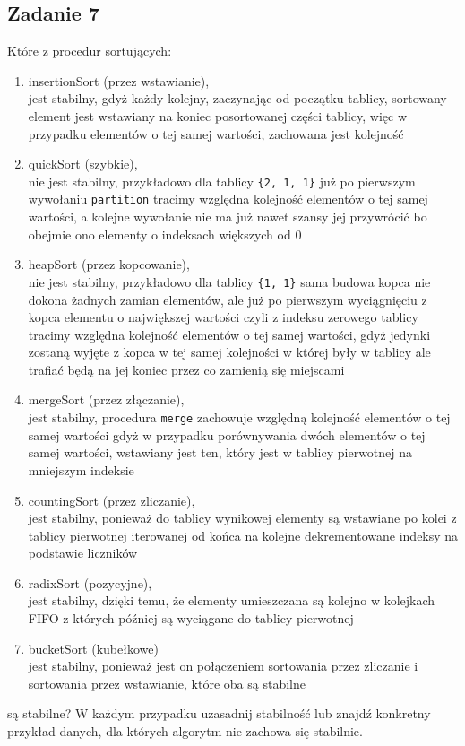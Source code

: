 \documentclass{article}
\begin{document}
\subsection*{Zadanie 7}
Które z procedur sortujących:
\begin{enumerate}[label=(\alph*)]
    \item insertionSort (przez wstawianie), \\
          jest stabilny, gdyż każdy kolejny, zaczynając od początku tablicy, sortowany element jest wstawiany na koniec
          posortowanej części tablicy, więc w przypadku elementów o tej samej wartości, zachowana jest kolejność
    \item quickSort (szybkie), \\
          nie jest stabilny, przykładowo dla tablicy \verb+{2, 1, 1}+ już po pierwszym wywołaniu \verb+partition+
          tracimy względna kolejność elementów o tej samej wartości, a kolejne wywołanie nie ma już nawet szansy jej
          przywrócić bo obejmie ono elementy o indeksach większych od $0$
    \item heapSort (przez kopcowanie), \\
          nie jest stabilny, przykładowo dla tablicy \verb+{1, 1}+ sama budowa kopca nie dokona żadnych zamian
          elementów, ale już po pierwszym wyciągnięciu z kopca elementu o największej wartości czyli z indeksu zerowego
          tablicy tracimy względna kolejność elementów o tej samej wartości, gdyż jedynki zostaną wyjęte z kopca
          w tej samej kolejności w której były w tablicy ale trafiać będą na jej koniec przez co zamienią się miejscami
    \item mergeSort (przez złączanie), \\
          jest stabilny, procedura \verb+merge+ zachowuje względną kolejność elementów o tej samej wartości gdyż w
          przypadku porównywania dwóch elementów o tej samej wartości, wstawiany jest ten, który jest w tablicy
          pierwotnej na mniejszym indeksie
    \item countingSort (przez zliczanie), \\
          jest stabilny, ponieważ do tablicy wynikowej elementy są wstawiane po kolei z tablicy pierwotnej iterowanej
          od końca na kolejne dekrementowane indeksy na podstawie liczników
    \item radixSort (pozycyjne), \\
          jest stabilny, dzięki temu, że elementy umieszczana są kolejno w kolejkach FIFO z których później są wyciągane
          do tablicy pierwotnej
    \item bucketSort (kubełkowe) \\
          jest stabilny, ponieważ jest on połączeniem sortowania przez zliczanie i sortowania przez wstawianie, które
          oba są stabilne
\end{enumerate}
są stabilne? W każdym przypadku uzasadnij stabilność lub znajdź konkretny przykład
danych, dla których algorytm nie zachowa się stabilnie.
\end{document}
